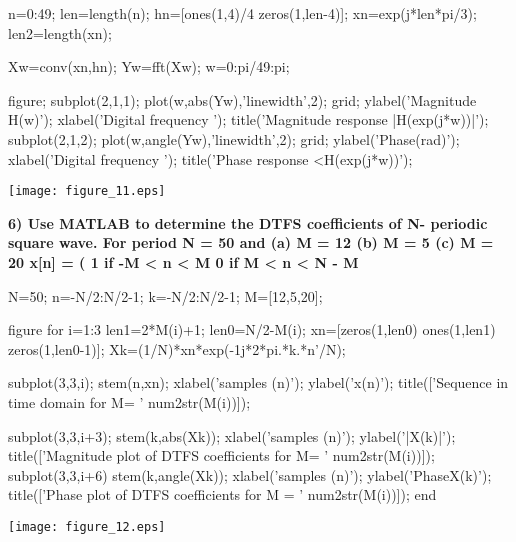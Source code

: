 \documentclass[12pt, onecolumn]{IEEEtran}
\begin{document}
\begin{matlabcode}
	n=0:49; %
	len=length(n);
	hn=[ones(1,4)/4 zeros(1,len-4)]; %
	xn=exp(j*len*pi/3); %
	len2=length(xn);
	
	Xw=conv(xn,hn); %
	Yw=fft(Xw); %
	w=0:pi/49:pi; %
	
	figure; subplot(2,1,1);
	plot(w,abs(Yw),'linewidth',2); grid; %
	ylabel('Magnitude H(w)'); xlabel('Digital frequency \omega');
	title('Magnitude response |H(exp(j*w))|');
	subplot(2,1,2);
	plot(w,angle(Yw),'linewidth',2); grid; %
	ylabel('Phase(rad)'); xlabel('Digital frequency \omega');
	title('Phase response <H(exp(j*w))');
\end{matlabcode}
\begin{center}
	\texttt{[image: figure\_11.eps]}
\end{center}

\begin{par}
	\begin{flushleft}
		\textbf{6) Use MATLAB to determine the DTFS coefficients of N- periodic square wave. For period N = 50 and (a) M = 12 (b) M = 5 (c) M = 20 x[n] = ( 1 if -M \textless{} n \textless{} M 0 if M \textless{} n \textless{} N - M}
	\end{flushleft}
\end{par}

\begin{matlabcode}
	N=50; %
	n=-N/2:N/2-1; %
	k=-N/2:N/2-1; %
	M=[12,5,20]; %
	
	figure
	for i=1:3
	len1=2*M(i)+1; %
	len0=N/2-M(i); %
	xn=[zeros(1,len0) ones(1,len1) zeros(1,len0-1)]; %
	Xk=(1/N)*xn*exp(-1j*2*pi.*k.*n'/N); %
	
	subplot(3,3,i);
	stem(n,xn); %
	xlabel('samples (n)');
	ylabel('x(n)');
	title(['Sequence in time domain for M= ' num2str(M(i))]);
	
	subplot(3,3,i+3);
	stem(k,abs(Xk)); %
	xlabel('samples (n)');
	ylabel('|X(k)|');
	title(['Magnitude plot of DTFS coefficients for M= ' num2str(M(i))]);
	subplot(3,3,i+6)
	stem(k,angle(Xk)); %
	xlabel('samples (n)');
	ylabel('Phase{X(k)}');
	title(['Phase plot of DTFS coefficients for M = ' num2str(M(i))]);
	end
\end{matlabcode}
\begin{center}
	\texttt{[image: figure\_12.eps]}
\end{center}
\end{document}
